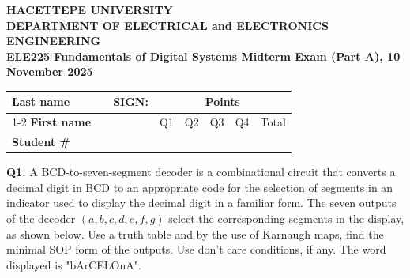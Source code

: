\documentclass[12pt]{article}
\begin{document}
\begin{center}
    \textbf{HACETTEPE UNIVERSITY}\\
    \textbf{DEPARTMENT OF ELECTRICAL and ELECTRONICS ENGINEERING}\\
    \textbf{ELE225 Fundamentals of Digital Systems Midterm Exam (Part A), 10 November 2025}
\end{center}


\begin{center}
\begin{tabular}{|p{2.2cm}|p{4.5cm}|p{3cm}|c|c|c|c|c|}
\hline
\textbf{Last name} & & \multirow{2}{*}{\textbf{SIGN:}} 
    & \multicolumn{5}{c|}{\textbf{Points}} \\ \cline{1-2}\cline{4-8}
\textbf{First name} & & 
    & Q1 & Q2 & Q3 & Q4 & Total \\ \hline

\textbf{Student \#} & & 
    &  &  &  &  &  \\ \hline
\end{tabular}
\end{center}

\noindent
\textbf{Q1.} A BCD-to-seven-segment decoder is a combinational circuit that converts a decimal digit in BCD to an appropriate code for the selection of segments in an indicator used to display the decimal digit in a familiar form. The seven outputs of the decoder $(a, b,c, d, e, f, g)$ select the corresponding segments in the display, as shown below. Use a truth table and by the use of Karnaugh maps, find the minimal SOP form of the outputs. Use don't care conditions, if any. The word displayed is "bArCELOnA".

\vspace{-1em}
\end{document}
